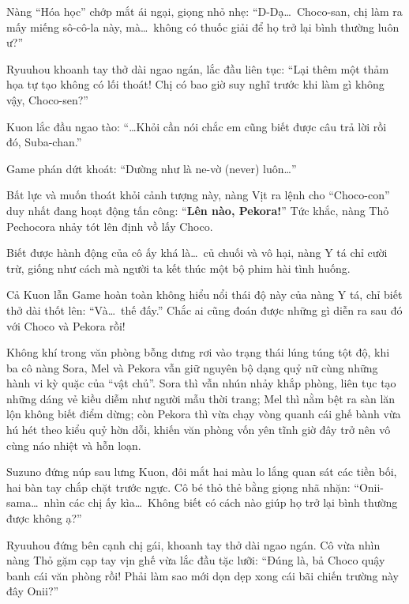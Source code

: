 \documentclass[../main.tex]{subfiles}
\begin{document}
Nàng ``Hóa học'' chớp mắt ái ngại, giọng nhỏ nhẹ: ``D-Dạ\dots\ Choco-san, chị làm ra mấy miếng sô-cô-la này, mà\dots\ không có thuốc giải để họ trở lại bình thường luôn ư?''

Ryuuhou khoanh tay thở dài ngao ngán, lắc đầu liên tục: ``Lại thêm một thảm họa tự tạo không có lối thoát! Chị có bao giờ suy nghĩ trước khi làm gì không vậy, Choco-sen?''

Kuon lắc đầu ngao tào: ``\dots Khỏi cần nói chắc em cũng biết được câu trả lời rồi đó, Suba-chan.''

Game phán dứt khoát: ``Dường như là ne-vờ (never) luôn\dots''

Bất lực và muốn thoát khỏi cảnh tượng này, nàng Vịt ra lệnh cho ``Choco-con'' duy nhất đang hoạt động tấn công: ``\textbf{Lên nào, Pekora!}'' Tức khắc, nàng Thỏ Pechocora nhảy tót lên định vồ lấy Choco.

Biết được hành động của cô ấy khá là\dots\ củ chuối và vô hại, nàng Y tá chỉ cười trừ, giống như cách mà người ta kết thúc một bộ phim hài tình huống.


Cả Kuon lẫn Game hoàn toàn không hiểu nổi thái độ này của nàng Y tá, chỉ biết thở dài thốt lên: ``Và\dots\ thế đấy.'' Chắc ai cũng đoán được những gì diễn ra sau đó với Choco và Pekora rồi!

\omk

Không khí trong văn phòng bỗng dưng rơi vào trạng thái lúng túng tột độ, khi ba cô nàng Sora, Mel và Pekora vẫn giữ nguyên bộ dạng quỷ nữ cùng những hành vi kỳ quặc của ``vật chủ''. Sora thì vẫn nhún nhảy khắp phòng, liên tục tạo những dáng vẻ kiều diễm như người mẫu thời trang; Mel thì nằm bệt ra sàn lăn lộn không biết điểm dừng; còn Pekora thì vừa chạy vòng quanh cái ghế bành vừa hú hét theo kiểu quỷ hờn dỗi, khiến văn phòng vốn yên tĩnh giờ đây trở nên vô cùng náo nhiệt và hỗn loạn.

Suzuno đứng núp sau lưng Kuon, đôi mắt hai màu lo lắng quan sát các tiền bối, hai bàn tay chắp chặt trước ngực. Cô bé thỏ thẻ bằng giọng nhã nhặn: ``Onii-sama\dots\ nhìn các chị ấy kìa\dots\ Không biết có cách nào giúp họ trở lại bình thường được không ạ?''

Ryuuhou đứng bên cạnh chị gái, khoanh tay thở dài ngao ngán. Cô vừa nhìn nàng Thỏ gặm cạp tay vịn ghế vừa lắc đầu tặc lưỡi: ``Đúng là, bả Choco quậy banh cái văn phòng rồi! Phải làm sao mới dọn dẹp xong cái bãi chiến trường này đây Onii?''
\end{document}
